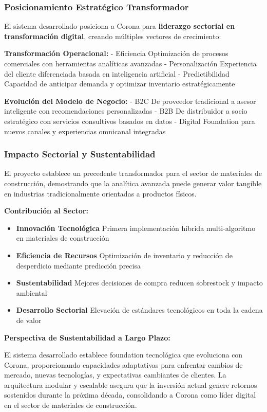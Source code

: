 \documentclass[twocolumn]{article}
\begin{document}
\subsubsection{Posicionamiento Estratégico Transformador}

El sistema desarrollado posiciona a Corona para \textbf{liderazgo sectorial en transformación digital}, creando múltiples vectores de crecimiento:

\textbf{Transformación Operacional:}
- {Eficiencia} Optimización de procesos comerciales con herramientas analíticas avanzadas
- {Personalización} Experiencia del cliente diferenciada basada en inteligencia artificial
- {Predictibilidad} Capacidad de anticipar demanda y optimizar inventario estratégicamente

\textbf{Evolución del Modelo de Negocio:}
- {B2C} De proveedor tradicional a asesor inteligente con recomendaciones personalizadas
- {B2B} De distribuidor a socio estratégico con servicios consultivos basados en datos
- {Digital} Foundation para nuevos canales y experiencias omnicanal integradas

\subsubsection{Impacto Sectorial y Sustentabilidad}

El proyecto establece un precedente transformador para el sector de materiales de construcción, demostrando que la analítica avanzada puede generar valor tangible en industrias tradicionalmente orientadas a productos físicos.

\textbf{Contribución al Sector:}
\begin{itemize}
    \item \textbf{Innovación Tecnológica} Primera implementación híbrida multi-algoritmo en materiales de construcción
    \item \textbf{Eficiencia de Recursos} Optimización de inventario y reducción de desperdicio mediante predicción precisa
    \item \textbf{Sustentabilidad} Mejores decisiones de compra reducen sobrestock y impacto ambiental
    \item \textbf{Desarrollo Sectorial} Elevación de estándares tecnológicos en toda la cadena de valor
\end{itemize}

\textbf{Perspectiva de Sustentabilidad a Largo Plazo:}

El sistema desarrollado establece foundation tecnológica que evoluciona con Corona, proporcionando capacidades adaptativas para enfrentar cambios de mercado, nuevas tecnologías, y expectativas cambiantes de clientes. La arquitectura modular y escalable asegura que la inversión actual genere retornos sostenidos durante la próxima década, consolidando a Corona como líder digital en el sector de materiales de construcción.
\end{document}
